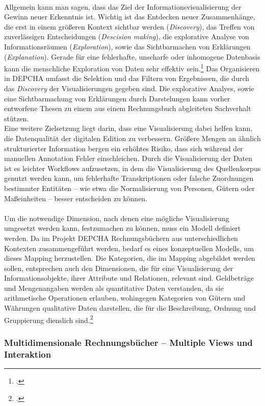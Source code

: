 \documentclass[12pt,a4paper]{article}
\begin{document}
\\
Allgemein kann man sagen, dass das Ziel der Informationsvisualisierung der Gewinn neuer Erkenntnis ist. Wichtig ist das Entdecken neuer Zusammenhänge, die erst in einem größeren Kontext sichtbar werden (\textit{Discovery}), das Treffen von zuverlässigen Entscheidungen (\textit{Descision making}), die explorative Analyse von Informationsräumen (\textit{Exploration}), sowie das Sichtbarmachen von Erklärungen (\textit{Explanation}). Gerade für eine fehlerhafte, unscharfe oder inhomogene Datenbasis kann die menschliche Exploration von Daten sehr effektiv sein.\footcite[][S.439-444]{preim2010interaktive} Das Organisieren in DEPCHA umfasst die Selektion und das Filtern von Ergebnissen, die durch das \textit{Discovery} der Visualisierungen gegeben sind. Die explorative Analyes, sowie eine Sichtbarmachung von Erklärungen durch Darstelungen kann vorher entworfene Thesen zu einem aus einem Rechnungsbuch abgleiteten Sachverhalt stützen.
\\
Eine weitere Zielsetzung liegt darin, dass eine Visualisierung dabei helfen kann, die Datenqualität der digitalen Edition zu verbessern. Größere Mengen an ähnlich strukturierter Information bergen ein erhöhtes Risiko, dass sich während der manuellen Annotation Fehler einschleichen. Durch die Visualisierung der Daten ist es leichter Workflows aufzusetzen, in dem die Visualisierung des Quellenkorpus genutzt werden kann, um fehlerhafte Transkriptionen oder falsche Zuordnungen bestimmter Entitäten -- wie etwa die Normalisierung von Personen, Gütern oder Maßeinheiten -- besser entscheiden zu können.
\\
\\
Um die notwendige Dimension, nach denen eine mögliche Visualisierung umgesetzt werden kann, festzumachen zu können, muss ein Modell definiert werden. Da im Projekt DEPCHA Rechnungsbüchern aus unterschiedlichen Kontexten zusammengeführt werden, bedarf es eines konzeptuellen Modells, um dieses Mapping herzustellen. Die Kategorien, die im Mapping abgebildet werden sollen, entsprechen auch den Dimensionen, die für eine Visualisierung der Informationsobjekte, ihrer Attribute und Relationen, relevant sind. Geldbeträge und Mengenangaben werden als quantitative Daten verstanden, da sie arithmetische Operationen erlauben, wohingegen Kategorien von Gütern und Währungen qualitative Daten darstellen, die für die Beschreibung, Ordnung und Gruppierung dienslich sind.\footcite[][S.448-450]{preim2010interaktive}

\subsubsection{Multidimensionale Rechnungsbücher – Multiple Views und Interaktion}
\end{document}
